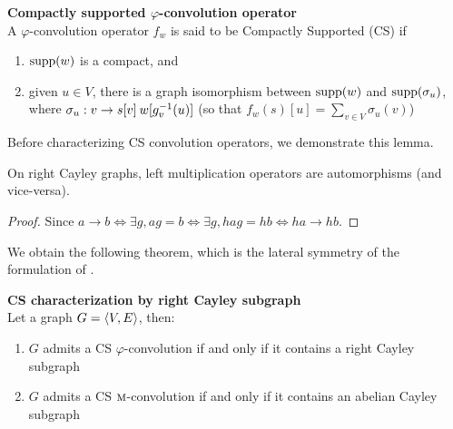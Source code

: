 \begin{definition}\textbf{Compactly supported $\varphi$-convolution operator}\\
A $\varphi$-convolution operator $f_w$ is said to be Compactly Supported (CS) if
\begin{enumerate}
  \item $\supp(w)$ is a compact, and
  \item given $u \in V$, there is a graph isomorphism between $\supp(w)$ and $\supp(\sigma_u)$, where $\sigma_u: v \to s[v] \h{2} w[g_v^{-1}(u)]$ (so that $f_w(s)[u] = \sum_{v \in V} \sigma_u(v)$)
\end{enumerate}
\end{definition}

Before characterizing CS convolution operators, we demonstrate this lemma.

\begin{lemma}
On right Cayley graphs, left multiplication operators are automorphisms (and vice-versa).
\label{lem:lat}
\end{lemma}
\begin{proof}
Since $a \rightarrow b \Leftrightarrow \exists g, ag = b \Leftrightarrow \exists g, hag = hb \Leftrightarrow ha \rightarrow hb$.
\end{proof}

We obtain the following theorem, which is the lateral symmetry of the formulation of .

\begin{theorem}\textbf{CS characterization by right Cayley subgraph}\\
Let a graph $\gve$, then:
\begin{enumerate}[label=(\roman*)]
\item $G$ admits a CS $\varphi$-convolution if and only if it contains a right Cayley subgraph
\item $G$ admits a CS $\M$-convolution if and only if it contains an abelian Cayley subgraph
\end{enumerate}
\label{th:cscayleychar}
\end{theorem}

